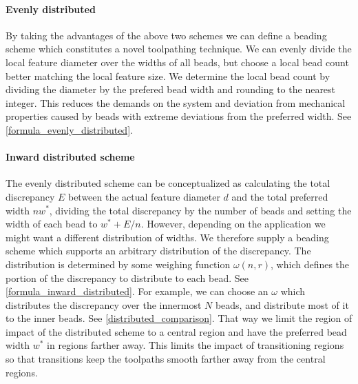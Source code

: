 \paragraph{Evenly distributed}
By taking the advantages of the above two schemes we can define a beading scheme which constitutes a novel toolpathing technique.
We can evenly divide the local feature diameter over the widths of all beads, but choose a local bead count better matching the local feature size.
We determine the local bead count by dividing the diameter by the prefered bead width and rounding to the nearest integer.
This reduces the demands on the system and deviation from mechanical properties caused by beads with extreme deviations from the preferred width.
See \cref{formula_evenly_distributed}.






\paragraph{Inward distributed scheme}
The evenly distributed scheme can be conceptualized as calculating the total discrepancy $E$ between the actual feature diameter $d$ and the total preferred width $n w^*$, dividing the total discrepancy by the number of beads and setting the width of each bead to 
$w^* + E / n$.
However, depending on the application we might want a different distribution of widths.
We therefore supply a beading scheme which supports an arbitrary distribution of the discrepancy.
The distribution is determined by some weighing function $\omega(n,r)$, which defines the portion of the discrepancy to distribute to each bead.
See \cref{formula_inward_distributed}.
For example, we can choose an $\omega$ which distributes the discrepancy over the innermost $N$ beads, and distribute most of it to the inner beads.
See \cref{distributed_comparison}.
That way we limit the region of impact of the distributed scheme to a central region and have the preferred bead width $w^*$ in regions farther away.
This limits the impact of transitioning regions so that transitions keep the toolpaths smooth farther away from the central regions. %






